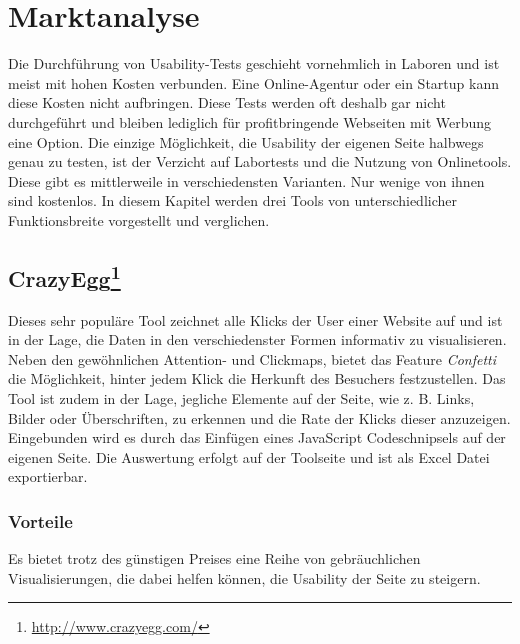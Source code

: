 %
%
%
%

\section{Marktanalyse}

Die Durchführung von Usability-Tests geschieht vornehmlich in Laboren und ist meist mit hohen Kosten verbunden. Eine Online-Agentur oder ein Startup kann diese Kosten nicht aufbringen. Diese Tests werden oft deshalb gar nicht durchgeführt und bleiben lediglich für profitbringende Webseiten mit Werbung eine Option. Die einzige Möglichkeit, die Usability der eigenen Seite halbwegs genau zu testen, ist der Verzicht auf Labortests und die Nutzung von Onlinetools. Diese gibt es mittlerweile in verschiedensten Varianten. Nur wenige von ihnen sind kostenlos. In diesem Kapitel werden drei Tools von unterschiedlicher Funktionsbreite vorgestellt und verglichen.

\subsection*{CrazyEgg\footnote{\url{http://www.crazyegg.com/}}}

Dieses sehr populäre Tool zeichnet alle Klicks der User einer Website auf und ist in der Lage, die Daten in den verschiedenster Formen informativ zu visualisieren. Neben den gewöhnlichen Attention- und Clickmaps, bietet das Feature \textit{Confetti} die Möglichkeit, hinter jedem Klick die Herkunft des Besuchers festzustellen. Das Tool ist zudem in der Lage, jegliche Elemente auf der Seite, wie z. B. Links, Bilder oder Überschriften, zu erkennen und die Rate der Klicks dieser anzuzeigen. Eingebunden wird es durch das Einfügen eines JavaScript Codeschnipsels auf der eigenen Seite. Die Auswertung erfolgt auf der Toolseite und ist als Excel Datei exportierbar.

\subsubsection*{Vorteile}
Es bietet trotz des günstigen Preises eine Reihe von gebräuchlichen Visualisierungen, die dabei helfen können, die Usability der Seite zu steigern.

